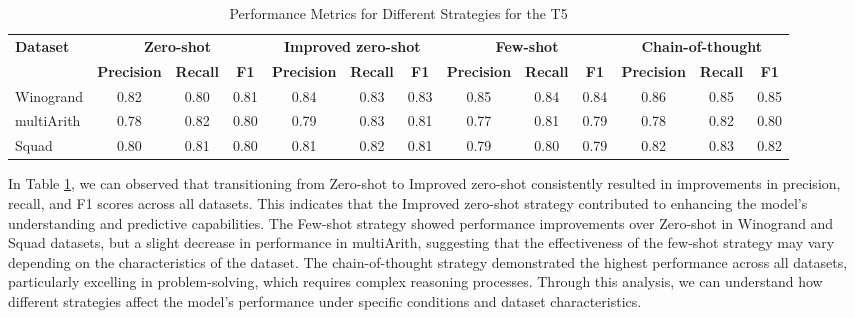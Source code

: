 \documentclass[fleqn,moreauthors,10pt]{ds_report}
\begin{document}







\begin{table}[!htbp]
\centering

\begin{adjustbox}{width=\columnwidth}
\begin{tabular}{@{}lcccccccccccc@{}}
\toprule
\textbf{Dataset} & \multicolumn{3}{c}{\textbf{Zero-shot}} & \multicolumn{3}{c}{\textbf{Improved zero-shot}} & \multicolumn{3}{c}{\textbf{Few-shot}} & \multicolumn{3}{c}{\textbf{Chain-of-thought}} \\
 & \textbf{Precision} & \textbf{Recall} & \textbf{F1} & \textbf{Precision} & \textbf{Recall} & \textbf{F1} & \textbf{Precision} & \textbf{Recall} & \textbf{F1} & \textbf{Precision} & \textbf{Recall} & \textbf{F1} \\ \midrule
 Winogrand & 0.82 & 0.80 & 0.81 & 0.84 & 0.83 & 0.83 & 0.85 & 0.84 & 0.84 & 0.86 & 0.85 & 0.85 \\
 multiArith & 0.78 &  0.82 & 0.80 & 0.79 & 0.83 & 0.81 & 0.77 & 0.81 & 0.79 & 0.78 & 0.82 & 0.80 \\ 
 Squad & 0.80 &  0.81 & 0.80 & 0.81 & 0.82 & 0.81 & 0.79 & 0.80 & 0.79 & 0.82 & 0.83 & 0.82 \\ \bottomrule
\end{tabular}
\end{adjustbox}
\caption{Performance Metrics for Different Strategies for the T5}
\label{tab:performance_metrics_T5}
\end{table}

In Table \ref{tab:performance_metrics_T5}, we can observed that transitioning from Zero-shot to Improved zero-shot consistently resulted in improvements in precision, recall, and F1 scores across all datasets. This indicates that the Improved zero-shot strategy contributed to enhancing the model's understanding and predictive capabilities. The Few-shot strategy showed performance improvements over Zero-shot in Winogrand and Squad datasets, but a slight decrease in performance in multiArith, suggesting that the effectiveness of the few-shot strategy may vary depending on the characteristics of the dataset. The chain-of-thought strategy demonstrated the highest performance across all datasets, particularly excelling in problem-solving, which requires complex reasoning processes. Through this analysis, we can understand how different strategies affect the model's performance under specific conditions and dataset characteristics.
\end{document}
